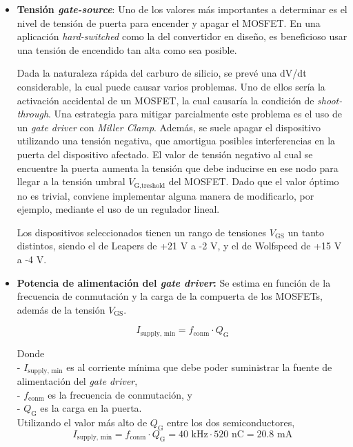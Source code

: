 \begin{itemize}
	
	\item \textbf{Tensión \textit{gate-source}}: Uno de los valores más importantes a determinar es el nivel de tensión de puerta para encender y apagar el MOSFET. En una aplicación \textit{hard-switched} como la del convertidor en diseño, es beneficioso usar una tensión de encendido tan alta como sea posible.
	
	Dada la naturaleza rápida del carburo de silicio, se prevé una dV/dt considerable, la cual puede causar varios problemas. Uno de ellos sería la activación accidental de un MOSFET, la cual causaría la condición de \textit{shoot-through}. Una estrategia para mitigar parcialmente este problema es el uso de un \textit{gate driver} con \textit{Miller Clamp}. Además, se suele apagar el dispositivo utilizando una tensión negativa, que amortigua posibles interferencias en la puerta del dispositivo afectado. El valor de tensión negativo al cual se encuentre la puerta aumenta la tensión que debe inducirse en ese nodo para llegar a la tensión umbral $V_{\text{G,treshold}}$ del MOSFET. Dado que el valor óptimo no es trivial, conviene implementar alguna manera de modificarlo, por ejemplo, mediante el uso de un regulador lineal.
	
	Los dispositivos seleccionados tienen un rango de tensiones $V_{\text{GS}}$ un tanto distintos, siendo el de Leapers de +21 V a -2 V, y el de Wolfspeed de +15 V a -4 V.
	
	\item \textbf{Potencia de alimentación del \textit{gate driver}:} Se estima en función de la frecuencia de conmutación y la carga de la compuerta de los MOSFETs, además de la tensión $V_{\text{GS}}$.
	
	\begin{equation}
	I_{\text{supply, min}} = f_{\text{conm}} \cdot Q_{\text{G}}
	\end{equation}
	
	Donde\\
	- \( I_{\text{supply, min}} \) es al corriente mínima que debe poder suministrar la fuente de alimentación del \textit{gate driver},\\
	- \( f_{\text{conm}} \) es la frecuencia de conmutación, y\\
	- \( Q_{\text{G}} \) es la carga en la puerta.\\
	
	Utilizando el valor más alto de $Q_{\text{G}}$ entre los dos semiconductores,
	\[
	I_{\text{supply, min}} = f_{\text{conm}}\cdot Q_{\text{G}} = 40 \text{ kHz} \cdot 520 \text{ nC} = 20.8 \text{ mA}
	\]
	

\end{itemize}
